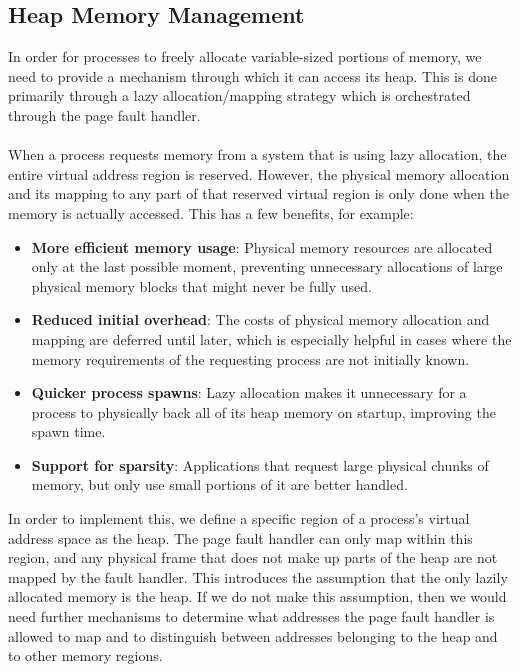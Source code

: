 \subsection{Heap Memory Management}\label{m2-4}
In order for processes to freely allocate variable-sized portions of memory, we need to provide a mechanism through which it can access its heap. This is done primarily through a lazy allocation/mapping strategy which is orchestrated through the page fault handler.
\\\\
When a process requests memory from a system that is using lazy allocation, the entire virtual address region is reserved. However, the physical memory allocation and its mapping to any part of that reserved virtual region is only done when the memory is actually accessed. This has a few benefits, for example:
\begin{itemize}[itemsep=0pt]
    \item \textbf{More efficient memory usage}: Physical memory resources are allocated only at the last possible moment, preventing unnecessary allocations of large physical memory blocks that might never be fully used.
    \item \textbf{Reduced initial overhead}: The costs of physical memory allocation and mapping are deferred until later, which is especially helpful in cases where the memory requirements of the requesting process are not initially known.
    \item \textbf{Quicker process spawns}: Lazy allocation makes it unnecessary for a process to physically back all of its heap memory on startup, improving the spawn time.
    \item \textbf{Support for sparsity}: Applications that request large physical chunks of memory, but only use small portions of it are better handled.
\end{itemize}
In order to implement this, we define a specific region of a process's virtual address space as the heap. The page fault handler can only map within this region, and any physical frame that does not make up parts of the heap are not mapped by the fault handler. This introduces the assumption that the only lazily allocated memory is the heap. If we do not make this assumption, then we would need further mechanisms to determine what addresses the page fault handler is allowed to map and to distinguish between addresses belonging to the heap and to other memory regions.
\\\\
